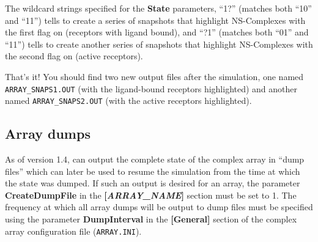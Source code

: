 The wildcard strings specified for the \textbf{State} parameters,
``1?'' (matches both ``10'' and ``11'') tells \stochsim{} to create a
series of snapshots that highlight NS-Complexes with the first flag on
(receptors with ligand bound), and ``?1'' (matches both ``01'' and
``11'') tells \stochsim{} to create another series of snapshots that
highlight NS-Complexes with the second flag on (active receptors).

That's it!  You should find two new output files after the
simulation, one named \texttt{ARRAY\_SNAPS1.OUT} (with the
ligand-bound receptors highlighted) and another named
\texttt{ARRAY\_SNAPS2.OUT} (with the active receptors highlighted).

\subsection{Array dumps}
As of version 1.4, \stochsim{} can output the complete state of the
complex array in ``dump files'' which can later be used to resume the
simulation from the time at which the state was dumped.  If such an
output is desired for an array, the parameter \textbf{CreateDumpFile}
in the \textbf{[\emph{ARRAY\_NAME}]} section must be set to 1.  The
frequency at which all array dumps will be output to dump files must
be specified using the parameter \textbf{DumpInterval} in the
\textbf{[General]} section of the complex array configuration file
(\texttt{ARRAY.INI}).



